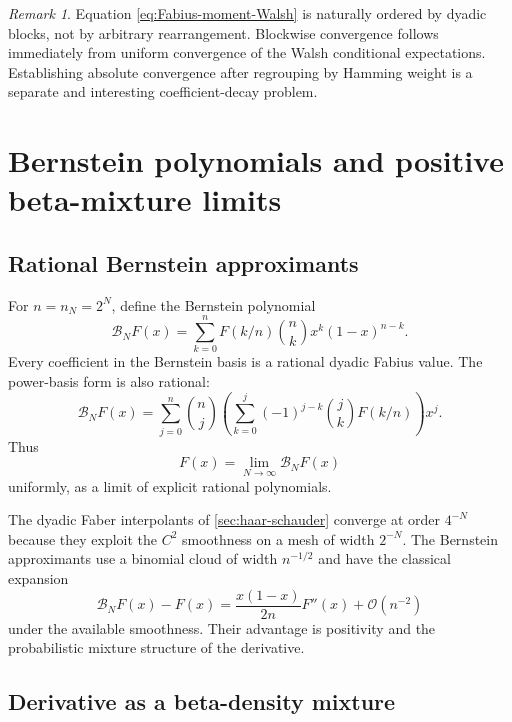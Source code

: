 \documentclass[11pt,oneside]{article}
\theoremstyle{definition}
\theoremstyle{remark}
\newtheorem{remark}[theorem]{Remark}
\newcommand{\bigO}{\mathcal O}
\begin{document}
\begin{remark}
Equation \eqref{eq:Fabius-moment-Walsh} is naturally ordered by dyadic blocks,
not by arbitrary rearrangement.  Blockwise convergence follows immediately
from uniform convergence of the Walsh conditional expectations.  Establishing
absolute convergence after regrouping by Hamming weight is a separate and
interesting coefficient-decay problem.
\end{remark}

\section{Bernstein polynomials and positive beta-mixture limits}
\label{sec:bernstein}

\subsection{Rational Bernstein approximants}

For $n=n_N=2^N$, define the Bernstein polynomial
\begin{equation}\label{eq:Bernstein-F}
 \mathcal B_NF(x)
 =\sum_{k=0}^{n}F(k/n)\binom nkx^k(1-x)^{n-k}.
\end{equation}
Every coefficient in the Bernstein basis is a rational dyadic Fabius value.
The power-basis form is also rational:
\begin{equation}\label{eq:Bernstein-power-basis}
 \mathcal B_NF(x)
 =\sum_{j=0}^{n}\binom nj
 \left(\sum_{k=0}^j(-1)^{j-k}\binom jkF(k/n)\right)x^j.
\end{equation}
Thus
\begin{equation}\label{eq:F-Bernstein-limit}
 F(x)=\lim_{N\to\infty}\mathcal B_NF(x)
\end{equation}
uniformly, as a limit of explicit rational polynomials.

The dyadic Faber interpolants of \cref{sec:haar-schauder} converge at order
$4^{-N}$ because they exploit the $C^2$ smoothness on a mesh of width $2^{-N}$.
The Bernstein approximants use a binomial cloud of width $n^{-1/2}$ and have the
classical expansion
\begin{equation}\label{eq:Voronovskaya}
 \mathcal B_NF(x)-F(x)
 =\frac{x(1-x)}{2n}F''(x)+\bigO(n^{-2})
\end{equation}
under the available smoothness.  Their advantage is positivity and the
probabilistic mixture structure of the derivative.

\subsection{Derivative as a beta-density mixture}
\end{document}
